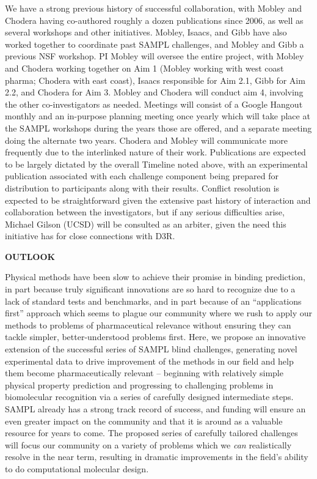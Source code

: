 \documentclass[11pt]{article}
\begin{document}
We have a strong previous history of successful collaboration, with Mobley and Chodera having co-authored roughly a dozen publications since 2006, as well as several workshops and other initiatives.
Mobley, Isaacs, and Gibb have also worked together to coordinate past SAMPL challenges, and Mobley and Gibb a previous NSF workshop. 
PI Mobley will oversee the entire project, with Mobley and Chodera working together on Aim 1 (Mobley working with west coast pharma; Chodera with east coast), Isaacs responsible for Aim 2.1, Gibb for Aim 2.2, and Chodera for Aim 3. Mobley and Chodera will conduct aim 4, involving the other co-investigators as needed.
Meetings will consist of a Google Hangout monthly and an in-purpose planning meeting once yearly which will take place at the SAMPL workshops during the years those are offered, and a separate meeting doing the alternate two years.
Chodera and Mobley will communicate more frequently due to the interlinked nature of their work.
Publications are expected to be largely dictated by the overall Timeline noted above, with an experimental publication associated with each challenge component being prepared for distribution to participants along with their results.
Conflict resolution is expected to be straightforward given the extensive past history of interaction and collaboration between the investigators, but if any serious difficulties arise, Michael Gilson (UCSD) will be consulted as an arbiter, given the need this initiative has for close connections with D3R.

{\large \bf OUTLOOK} %

Physical methods have been slow to achieve their promise in binding prediction, in part because truly significant innovations are so hard to recognize due to a lack of standard tests and benchmarks, and in part because of an ``applications first'' approach which seems to plague our community where we rush to apply our methods to problems of pharmaceutical relevance without ensuring they can tackle simpler, better-understood problems first.
Here, we propose an innovative extension of the successful series of SAMPL blind challenges, generating novel experimental data to drive improvement of the methods in our field and help them become pharmaceutically relevant -- beginning with relatively simple physical property prediction and progressing to challenging problems in biomolecular recognition via a series of carefully designed intermediate steps.
SAMPL already has a strong track record of success, and funding will ensure an even greater impact on the community and that it is around as a valuable resource for years to come.
The proposed series of carefully tailored challenges will focus our community on a variety of problems which we \emph{can} realistically resolve in the near term, resulting in dramatic improvements in the field's ability to do computational molecular design.
\end{document}
